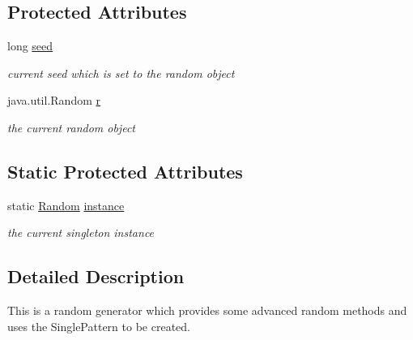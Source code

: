\subsection*{Protected Attributes}
\begin{DoxyCompactItemize}
\item 
\hypertarget{classcom_1_1msu_1_1moo_1_1util_1_1Random_ae2ac6497beef04b12a28cb6e4706b57c}{long \hyperlink{classcom_1_1msu_1_1moo_1_1util_1_1Random_ae2ac6497beef04b12a28cb6e4706b57c}{seed}}\label{classcom_1_1msu_1_1moo_1_1util_1_1Random_ae2ac6497beef04b12a28cb6e4706b57c}

\begin{DoxyCompactList}\small\item\em current seed which is set to the random object \end{DoxyCompactList}\item 
\hypertarget{classcom_1_1msu_1_1moo_1_1util_1_1Random_ae1ad9be1fc9e28ccbcadfa8355fe082f}{java.\-util.\-Random \hyperlink{classcom_1_1msu_1_1moo_1_1util_1_1Random_ae1ad9be1fc9e28ccbcadfa8355fe082f}{r}}\label{classcom_1_1msu_1_1moo_1_1util_1_1Random_ae1ad9be1fc9e28ccbcadfa8355fe082f}

\begin{DoxyCompactList}\small\item\em the current random object \end{DoxyCompactList}\end{DoxyCompactItemize}
\subsection*{Static Protected Attributes}
\begin{DoxyCompactItemize}
\item 
\hypertarget{classcom_1_1msu_1_1moo_1_1util_1_1Random_a711b7af562b8f9f3d1e7ac04a5063aa0}{static \hyperlink{classcom_1_1msu_1_1moo_1_1util_1_1Random}{Random} \hyperlink{classcom_1_1msu_1_1moo_1_1util_1_1Random_a711b7af562b8f9f3d1e7ac04a5063aa0}{instance}}\label{classcom_1_1msu_1_1moo_1_1util_1_1Random_a711b7af562b8f9f3d1e7ac04a5063aa0}

\begin{DoxyCompactList}\small\item\em the current singleton instance \end{DoxyCompactList}\end{DoxyCompactItemize}


\subsection{Detailed Description}
This is a random generator which provides some advanced random methods and uses the Single\-Pattern to be created. 


